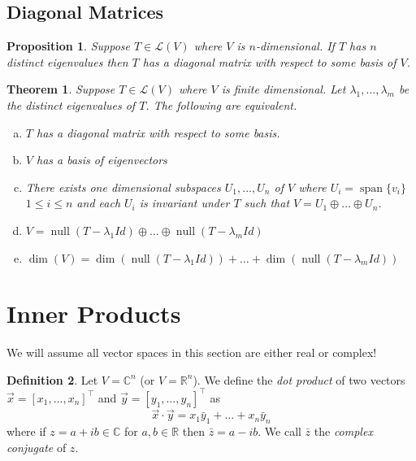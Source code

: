 \documentclass[12pt,letterpaper]{article}
\newcommand{\nul}{\operatorname {null}}
\renewcommand{\span}{\operatorname {span}}
\theoremstyle{plain}
\newtheorem{theorem}{Theorem}[section]
\newtheorem{proposition}{Proposition}[section]
\theoremstyle{definition}
\newtheorem{definition}[theorem]{Definition}
\numberwithin{equation}{section}
\begin{document}
\subsection{Diagonal Matrices}
\begin{proposition}Suppose $T\in \mathcal{L}(V)$ where $V$ is $n$-dimensional. If $T$ has $n$ distinct eigenvalues then $T$ has a diagonal matrix with respect to some basis of $V$. 
\end{proposition}

\begin{theorem} Suppose $T\in \mathcal{L}(V)$ where $V$ is finite dimensional. Let $\lambda_1, \ldots, \lambda_m$ be the distinct eigenvalues of $T$. The following are equivalent. 
\begin{enumerate}[(a)]
\item $T$ has a diagonal matrix with respect to some basis. 
\item $V$ has a basis of eigenvectors
\item There exists one dimensional subspaces $U_1, \ldots, U_n$ of $V$ where $U_i=\span\{v_i\}$ $1\leq i\leq n$ and each $U_i$ is invariant under $T$ such that $V=U_1\oplus \ldots \oplus U_n$. 
\item $V=\nul(T-\lambda_1Id)\oplus \ldots \oplus \nul(T-\lambda_m Id)$ 
\item $\dim(V)=\dim(\nul(T-\lambda_1Id))+ \ldots  + \dim(\nul(T-\lambda_m Id))$ 
\end{enumerate}
\end{theorem}

\section{Inner Products} 
{\color{red}{\bf \noindent Note: }We will assume all vector spaces in this section are either real or complex!}

\begin{definition}Let $V=\mathbb{C}^n$ (or $V=\mathbb{R}^n$). We define the \emph{dot product} of two vectors $\vec{x}=\left[x_1,\ldots ,x_n\right]^\top$ and $\vec{y}=\left[y_1,\ldots ,y_n\right]^\top$ as 
\[\vec{x}\cdot \vec{y}=x_1\bar{y}_1+\ldots+x_n\bar{y}_n\] where if $z=a+ib\in \mathbb{C}$ for $a,b\in \mathbb{R}$ then $\bar{z}=a-ib$. We call $\bar{z}$ the \emph{complex conjugate} of $z$. 
\end{definition}
\end{document}
